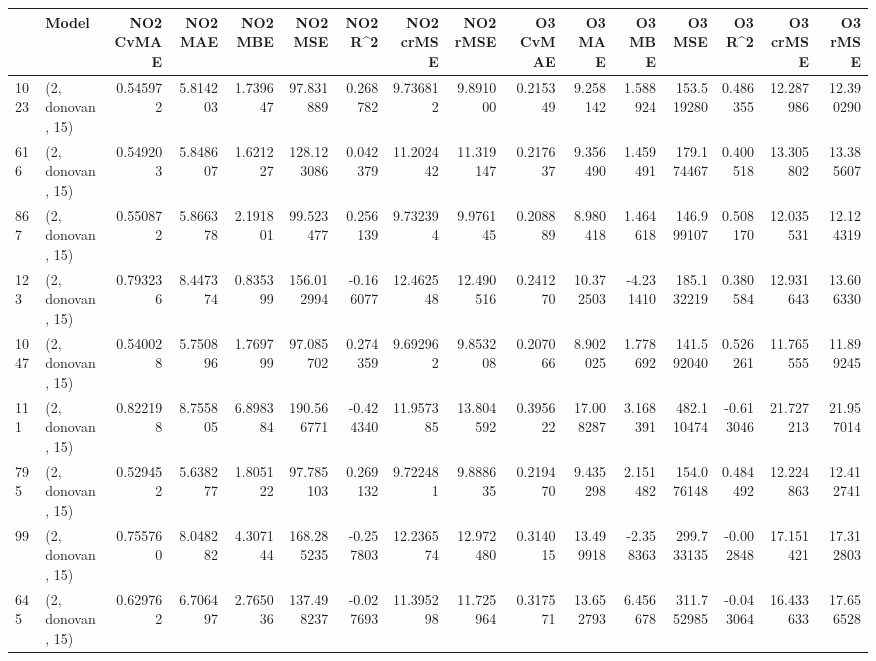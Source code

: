 \begin{tabular}{llrrrrrrrrrrrrrr}
\toprule
{} &             Model &  NO2 CvMAE &    NO2 MAE &    NO2 MBE &       NO2 MSE &     NO2 R\textasciicircum 2 &   NO2 crMSE &    NO2 rMSE &  O3 CvMAE &     O3 MAE &     O3 MBE &       O3 MSE &     O3 R\textasciicircum 2 &   O3 crMSE &    O3 rMSE \\
\midrule
1023 &  (2, donovan, 15) &   0.545972 &   5.814203 &   1.739647 &     97.831889 &    0.268782 &    9.736812 &    9.891000 &  0.215349 &   9.258142 &   1.588924 &   153.519280 &   0.486355 &  12.287986 &  12.390290 \\
616  &  (2, donovan, 15) &   0.549203 &   5.848607 &   1.621227 &    128.123086 &    0.042379 &   11.202442 &   11.319147 &  0.217637 &   9.356490 &   1.459491 &   179.174467 &   0.400518 &  13.305802 &  13.385607 \\
867  &  (2, donovan, 15) &   0.550872 &   5.866378 &   2.191801 &     99.523477 &    0.256139 &    9.732394 &    9.976145 &  0.208889 &   8.980418 &   1.464618 &   146.999107 &   0.508170 &  12.035531 &  12.124319 \\
123  &  (2, donovan, 15) &   0.793236 &   8.447374 &   0.835399 &    156.012994 &   -0.166077 &   12.462548 &   12.490516 &  0.241270 &  10.372503 &  -4.231410 &   185.132219 &   0.380584 &  12.931643 &  13.606330 \\
1047 &  (2, donovan, 15) &   0.540028 &   5.750896 &   1.769799 &     97.085702 &    0.274359 &    9.692962 &    9.853208 &  0.207066 &   8.902025 &   1.778692 &   141.592040 &   0.526261 &  11.765555 &  11.899245 \\
111  &  (2, donovan, 15) &   0.822198 &   8.755805 &   6.898384 &    190.566771 &   -0.424340 &   11.957385 &   13.804592 &  0.395622 &  17.008287 &   3.168391 &   482.110474 &  -0.613046 &  21.727213 &  21.957014 \\
795  &  (2, donovan, 15) &   0.529452 &   5.638277 &   1.805122 &     97.785103 &    0.269132 &    9.722481 &    9.888635 &  0.219470 &   9.435298 &   2.151482 &   154.076148 &   0.484492 &  12.224863 &  12.412741 \\
99   &  (2, donovan, 15) &   0.755760 &   8.048282 &   4.307144 &    168.285235 &   -0.257803 &   12.236574 &   12.972480 &  0.314015 &  13.499918 &  -2.358363 &   299.733135 &  -0.002848 &  17.151421 &  17.312803 \\
645  &  (2, donovan, 15) &   0.629762 &   6.706497 &   2.765036 &    137.498237 &   -0.027693 &   11.395298 &   11.725964 &  0.317571 &  13.652793 &   6.456678 &   311.752985 &  -0.043064 &  16.433633 &  17.656528 \\

\end{tabular}
